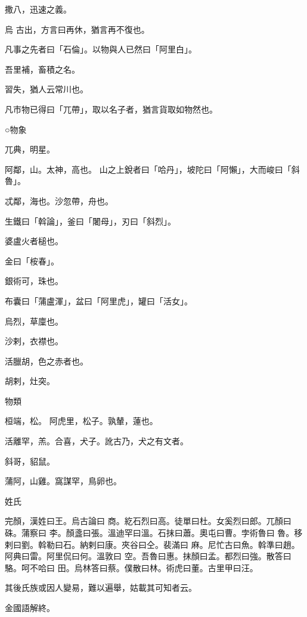 \begin{pinyinscope}
 撒八，迅速之義。



 烏
 古出，方言曰再休，猶言再不復也。



 凡事之先者曰「石倫」。以物與人已然曰「阿里白」。



 吾里補，畜積之名。



 習失，猶人云常川也。



 凡市物已得曰「兀帶」，取以名子者，猶言貨取如物然也。



 ○物象



 兀典，明星。



 阿鄰，山。太神，高也。
 山之上銳者曰「哈丹」，坡陀曰「阿懶」，大而峻曰「斜魯」。



 忒鄰，海也。沙忽帶，舟也。



 生鐵曰「斡論」，釜曰「闍母」，刃曰「斜烈」。



 婆盧火者槌也。



 金曰「桉春」。



 銀術可，珠也。



 布囊曰「蒲盧渾」，盆曰「阿里虎」，罐曰「活女」。



 烏烈，草廩也。



 沙剌，衣襟也。



 活臘胡，色之赤者也。



 胡剌，灶突。



 物類



 桓端，松。
 阿虎里，松子。孰輦，蓮也。



 活離罕，羔。合喜，犬子。訛古乃，犬之有文者。



 斜哥，貂鼠。



 蒲阿，山雞。窩謀罕，鳥卵也。



 姓氏



 完顏，漢姓曰王。烏古論曰
 商。紇石烈曰高。徒單曰杜。女奚烈曰郎。兀顏曰硃。蒲察曰
 李。顏盞曰張。溫迪罕曰溫。石抹曰蕭。奧屯曰曹。孛術魯曰
 魯。移剌曰劉。斡勒曰石。納剌曰康。夾谷曰仝。裴滿曰
 麻。尼忙古曰魚。斡準曰趙。阿典曰雷。阿里侃曰何。溫敦曰
 空。吾魯曰惠。抹顏曰孟。都烈曰強。散答曰駱。呵不哈曰
 田。烏林答曰蔡。僕散曰林。術虎曰董。古里甲曰汪。



 其後氏族或因人變易，難以遍舉，姑載其可知者云。



 金國語解終。



\end{pinyinscope}